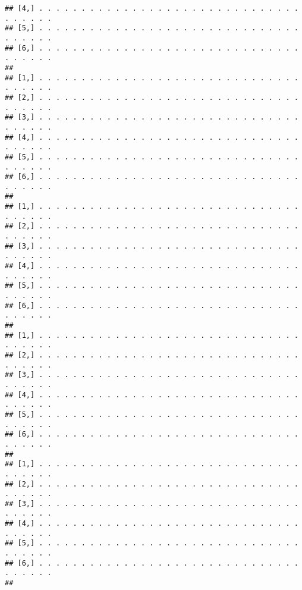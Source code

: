 \documentclass[
]{book}
\begin{document}
\begin{verbatim}
## [4,] . . . . . . . . . . . . . . . . . . . . . . . . . . . . . . . . . . . . .
## [5,] . . . . . . . . . . . . . . . . . . . . . . . . . . . . . . . . . . . . .
## [6,] . . . . . . . . . . . . . . . . . . . . . . . . . . . . . . . . . . . . .
##                                                                               
## [1,] . . . . . . . . . . . . . . . . . . . . . . . . . . . . . . . . . . . . .
## [2,] . . . . . . . . . . . . . . . . . . . . . . . . . . . . . . . . . . . . .
## [3,] . . . . . . . . . . . . . . . . . . . . . . . . . . . . . . . . . . . . .
## [4,] . . . . . . . . . . . . . . . . . . . . . . . . . . . . . . . . . . . . .
## [5,] . . . . . . . . . . . . . . . . . . . . . . . . . . . . . . . . . . . . .
## [6,] . . . . . . . . . . . . . . . . . . . . . . . . . . . . . . . . . . . . .
##                                                                               
## [1,] . . . . . . . . . . . . . . . . . . . . . . . . . . . . . . . . . . . . .
## [2,] . . . . . . . . . . . . . . . . . . . . . . . . . . . . . . . . . . . . .
## [3,] . . . . . . . . . . . . . . . . . . . . . . . . . . . . . . . . . . . . .
## [4,] . . . . . . . . . . . . . . . . . . . . . . . . . . . . . . . . . . . . .
## [5,] . . . . . . . . . . . . . . . . . . . . . . . . . . . . . . . . . . . . .
## [6,] . . . . . . . . . . . . . . . . . . . . . . . . . . . . . . . . . . . . .
##                                                                               
## [1,] . . . . . . . . . . . . . . . . . . . . . . . . . . . . . . . . . . . . .
## [2,] . . . . . . . . . . . . . . . . . . . . . . . . . . . . . . . . . . . . .
## [3,] . . . . . . . . . . . . . . . . . . . . . . . . . . . . . . . . . . . . .
## [4,] . . . . . . . . . . . . . . . . . . . . . . . . . . . . . . . . . . . . .
## [5,] . . . . . . . . . . . . . . . . . . . . . . . . . . . . . . . . . . . . .
## [6,] . . . . . . . . . . . . . . . . . . . . . . . . . . . . . . . . . . . . .
##                                                                               
## [1,] . . . . . . . . . . . . . . . . . . . . . . . . . . . . . . . . . . . . .
## [2,] . . . . . . . . . . . . . . . . . . . . . . . . . . . . . . . . . . . . .
## [3,] . . . . . . . . . . . . . . . . . . . . . . . . . . . . . . . . . . . . .
## [4,] . . . . . . . . . . . . . . . . . . . . . . . . . . . . . . . . . . . . .
## [5,] . . . . . . . . . . . . . . . . . . . . . . . . . . . . . . . . . . . . .
## [6,] . . . . . . . . . . . . . . . . . . . . . . . . . . . . . . . . . . . . .
##                                                                               

\end{verbatim}
\end{document}
